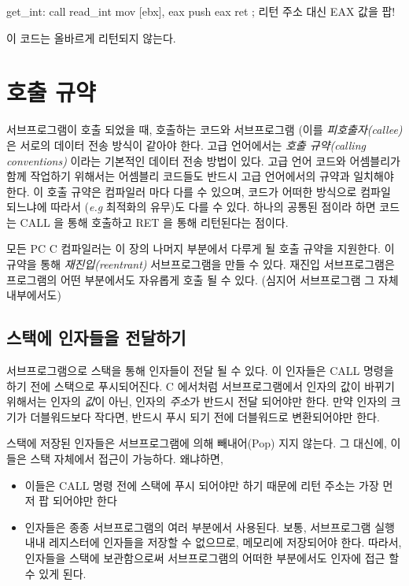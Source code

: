 \begin{AsmCodeListing}[frame=none]
get_int:
      call   read_int
      mov    [ebx], eax
      push   eax
      ret                  ; 리턴 주소 대신 EAX 값을 팝!
\end{AsmCodeListing}
이 코드는 올바르게 리턴되지 않는다. 


\section{호출 규약}

서브프로그램이 호출 되었을 때, 호출하는 코드와 서브프로그램 (이를 
\emph{피호출자(callee)} 은 서로의 데이터 전송 방식이 같아야 한다. 
고급 언어에서는 \emph{호출 규약(calling conventions)} 이라는 기본적인 
데이터 전송 방법이 있다. 고급 언어 코드와 어셈블리가 함께 작업하기 위해서는
어셈블리 코드들도 반드시 고급 언어에서의 규약과 일치해야 한다. 이 호출 규약은
컴파일러 마다 다를 수 있으며, 코드가 어떠한 방식으로 컴파일 되느냐에 따라서
(\emph{e.g} 최적화의 유무)도 다를 수 있다. 하나의 공통된 점이라 하면
코드는 {\code CALL} 을 통해 호출하고 {\code RET} 을 통해 리턴된다는 점이다. 

모든 PC C 컴파일러는 이 장의 나머지 부분에서 다루게 될 호출 규약을 지원한다. 
이 규약을 통해 \emph{재진입(reentrant)} 서브프로그램을 만들 수 있다. 재진입
서브프로그램은 프로그램의 어떤 부분에서도 자유롭게 호출 될 수 있다. 
(심지어 서브프로그램 그 자체 내부에서도) 

\subsection{스택에 인자들을 전달하기}

서브프로그램으로 스택을 통해 인자들이 전달 될 수 있다. 이 인자들은 {\code CALL}
명령을 하기 전에 스택으로 푸시되어진다. C 에서처럼 서브프로그램에서 인자의 
값이 바뀌기 위해서는 인자의 \emph{값}이 아닌, 인자의 \emph{주소}가 반드시 
전달 되어야만 한다. 만약 인자의 크기가 더블워드보다 작다면, 반드시 푸시 되기
전에 더블워드로 변환되어야만 한다. 

스택에 저장된 인자들은 서브프로그램에 의해 빼내어(Pop) 지지 않는다. 그 대신에, 이
들은 스택 자체에서 접근이 가능하다. 왜냐하면, 

\begin{itemize}
\item 이들은 {\code CALL} 명령 전에 스택에 푸시 되어야만 하기 때문에 
리턴 주소는 가장 먼저 팝 되어야만 한다 

\item 인자들은 종종 서브프로그램의 여러 부분에서 사용된다. 보통, 서브프로그램
실행 내내 레지스터에 인자들을 저장할 수 없으므로, 메모리에 저장되어야 한다.
따라서, 인자들을 스택에 보관함으로써 서브프로그램의 어떠한 부분에서도 인자에
접근 할 수 있게 된다. 

\end{itemize}

